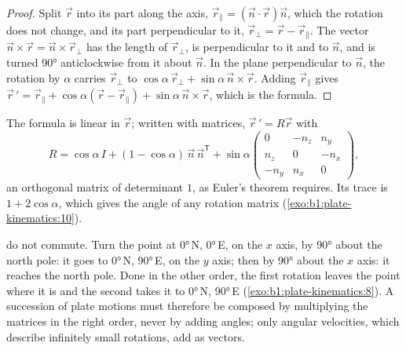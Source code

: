\begin{proof}
Split $\vec r$ into its part along the axis, $\vec r_\parallel =
(\vec n\cdot\vec r)\vec n$, which the rotation does not change, and its part
perpendicular to it, $\vec r_\perp = \vec r - \vec r_\parallel$. The vector
$\vec n\times\vec r = \vec n\times\vec r_\perp$ has the length of $\vec r_\perp$,
is perpendicular to it and to $\vec n$, and is turned \ang{90} anticlockwise from
it about $\vec n$. In the plane perpendicular to $\vec n$, the rotation by
$\alpha$ carries $\vec r_\perp$ to $\cos\alpha\,\vec r_\perp +
\sin\alpha\,\vec n\times\vec r$. Adding $\vec r_\parallel$ gives $\vec r\,' =
\vec r_\parallel + \cos\alpha(\vec r - \vec r_\parallel) + \sin\alpha\,
\vec n\times\vec r$, which is the formula.
\end{proof}

The formula is linear in $\vec r$; written with matrices, $\vec r\,' = R\vec r$
with
\[
  R = \cos\alpha\,I + (1 - \cos\alpha)\,\vec n\,\vec n^{\mathsf T}
  + \sin\alpha
  \begin{pmatrix} 0 & -n_z & n_y\\ n_z & 0 & -n_x\\ -n_y & n_x & 0\end{pmatrix},
\]
an orthogonal matrix of determinant $1$, as Euler's theorem requires. Its trace
is $1 + 2\cos\alpha$, which gives the angle of any rotation matrix
(\cref{exo:b1:plate-kinematics:10}).

 do not commute. Turn the point at \ang{0}\,N, \ang{0}\,E, on
the $x$ axis, by \ang{90} about the north pole: it goes to \ang{0}\,N,
\ang{90}\,E, on the $y$ axis; then by \ang{90} about the $x$ axis: it reaches
the north pole. Done in the other order, the first rotation leaves the point
where it is and the second takes it to \ang{0}\,N, \ang{90}\,E (\cref{exo:b1:plate-kinematics:8}).
A succession of plate motions must therefore be composed by multiplying the
matrices in the right order, never by adding angles; only angular velocities,
which describe infinitely small rotations, add as vectors.

